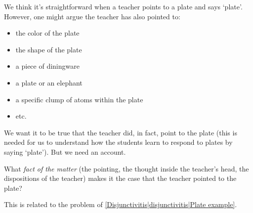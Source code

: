 We think it's straightforward when a teacher points to a plate and says `plate'. However, one might argue the teacher has also pointed to:

\begin{itemize}
\item the color of the plate
\item the shape of the plate
\item a piece of diningware
\item a plate or an elephant
\item a specific clump of atoms within the plate
\item etc.
\end{itemize}

We want it to be true that the teacher did, in fact, point to the plate (this is needed for us to understand how the students learn to respond to plates by saying `plate'). But we need an account.

What \emph{fact of the matter} (the pointing, the thought inside the teacher's head, the dispositions of the teacher) makes it the case that the teacher pointed to the plate?

This is related to the problem of \ref{Disjunctivitis|disjunctivitis|Plate example}.
